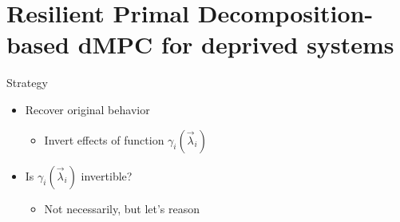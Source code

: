 \documentclass[aspectratio=169]{beamer}
\begin{document}
\section{Resilient Primal Decomposition-based dMPC for deprived systems}


\begin{frame}{Strategy}
  \begin{itemize}
    \item<1-> Recover original behavior
          \begin{itemize}
            \item<2-> Invert effects of function $\gamma_{i}(\vec{\lambda}_{i})$
          \end{itemize}
  \end{itemize}

  \begin{itemize}
    \item<3-> Is $\gamma_{i}(\vec{\lambda}_{i})$ invertible?
          \begin{itemize}
            \item<4-> Not necessarily, but let's reason
          \end{itemize}
          \centering
  \end{itemize}

\end{frame}
\end{document}
